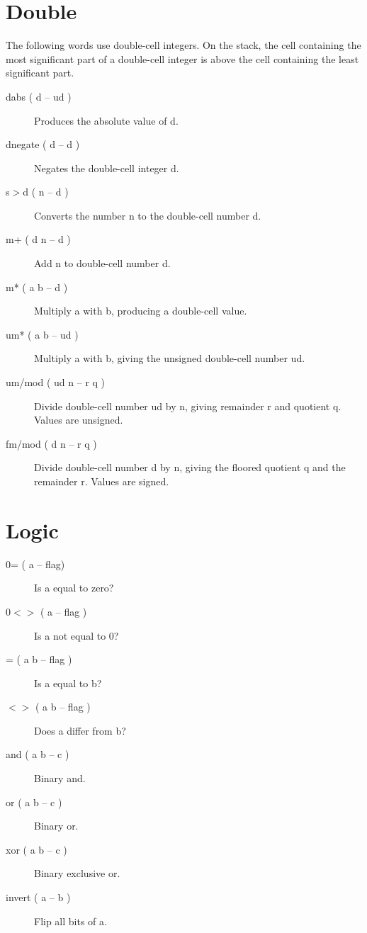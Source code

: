 \section{Double}

The following words use double-cell integers. On the stack, the cell containing the most significant part of a double-cell integer is above the cell containing the least significant part.

\begin{description}
\item[dabs ( d -- ud )] Produces the absolute value of d.
\item[dnegate ( d -- d )] Negates the double-cell integer d.
\item[s$>$d ( n -- d )] Converts the number n to the double-cell number d.
\item[m+ ( d n -- d )] Add n to double-cell number d.
\item[m* ( a b -- d )] Multiply a with b, producing a double-cell value.
\item[um* ( a b -- ud )] Multiply a with b, giving the unsigned double-cell number ud.
\item[um/mod ( ud n -- r q )] Divide double-cell number ud by n, giving remainder r and quotient q. Values are unsigned.
\item[fm/mod ( d n -- r q )] Divide double-cell number d by n, giving the floored quotient q and the remainder r. Values are signed.
\end{description}

\section{Logic}

\begin{description}
\item[0= ( a -- flag)] Is a equal to zero?
\item[0$<>$ ( a -- flag )] Is a not equal to 0?
\item[= ( a b -- flag )] Is a equal to b?
\item[$<>$ ( a b -- flag )] Does a differ from b?
\item[and ( a b -- c )] Binary and.
\item[or ( a b -- c )] Binary or.
\item[xor ( a b -- c )] Binary exclusive or.
\item[invert ( a -- b )] Flip all bits of a.
\end{description}

